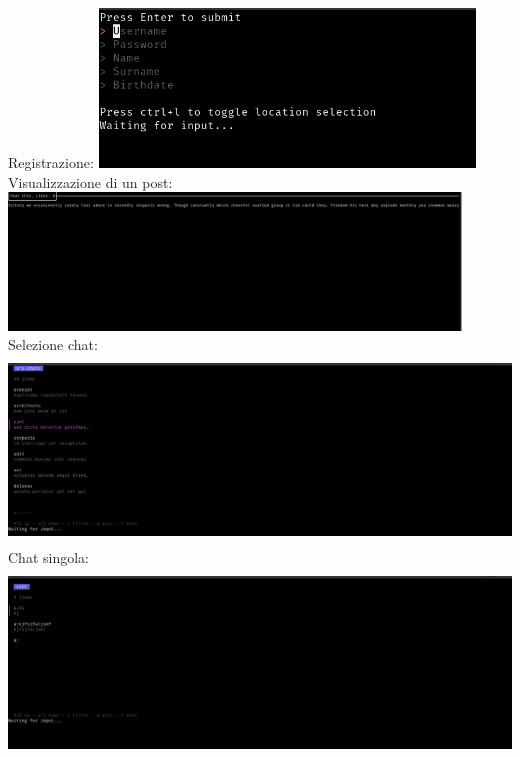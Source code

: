 \documentclass[a4paper,12pt]{report}
\begin{document}
Registrazione:
\newline
\includegraphics[width=10cm]{img/signup.png}
\newline
Visualizzazione di un post:
\newline
\includegraphics[width=12cm]{img/post_view.png}
\newline
Selezione chat:
\newline
\includegraphics[height=5cm]{img/chats_view.png}
Chat singola:
\newline
\includegraphics[height=5cm]{img/single_chat_view.png}
\newline
\end{document}
